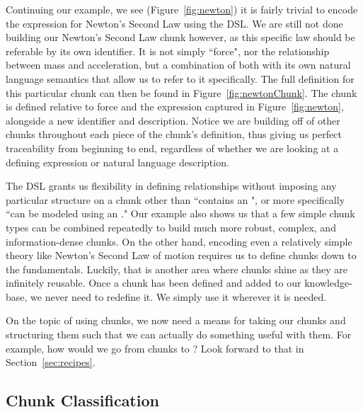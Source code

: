 
Continuing our example, we see (Figure~\ref{fig:newton}) it is fairly trivial 
to encode the expression for Newton's Second Law using the  DSL. We 
are still not done building our Newton's Second Law chunk however, as this 
specific law should be referable by its own identifier. It is not simply 
``force", nor the relationship between mass and acceleration, but a combination 
of both with its own natural language semantics that allow us to refer to it 
specifically. The full definition for this particular chunk can then be found 
in Figure~\ref{fig:newtonChunk}. The chunk is defined relative to force and the 
expression captured in Figure~\ref{fig:newton}, alongside a new identifier and 
description. Notice we are building off of other chunks throughout each piece 
of the chunk's definition, thus giving us perfect traceability from beginning 
to end, regardless of whether we are looking at a defining expression or 
natural language description.


The  DSL grants us flexibility in defining relationships without 
imposing any particular structure on a chunk other than ``contains an 
", or more specifically ``can be modeled using an ." 
Our example also shows us that a few simple chunk types can be combined 
repeatedly to build much more robust, complex, and information-dense chunks. On 
the other hand, encoding even a relatively simple theory like Newton's Second 
Law of motion requires us to define chunks down to the fundamentals. 
Luckily, that is another area where chunks shine as they are infinitely 
reusable. Once a chunk has been defined and added to our knowledge-base, we 
never need to redefine it. We simply use it wherever it is needed.

On the topic of using chunks, we now need a means for taking our chunks and 
structuring them such that we can actually do something useful with them. For 
example, how would we go from chunks to \sfs{}? Look forward to that in 
Section~\ref{sec:recipes}.

\subsection{Chunk Classification}


